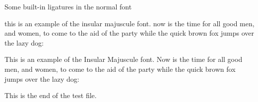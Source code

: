 \documentclass[12pt]{article}
\newcommand{\sentence}{%
this is an example of the insular majuscule font. now is the time for all good
men, and women, to come to the aid of the party while the quick brown fox
jumps over the lazy dog:}
\newcommand{\Sentence}{%
This is an example of the Insular Majuscule font. Now is the time for all good
men, and women, to come to the aid of the party while the quick brown fox
jumps over the lazy dog:}
\newcommand{\esses}{sa sb sc sd se sf sg sh si sj sk sl sm 
                    sn so sp sq sr ss st su sv sw sx sy sz}
\newcommand{\exes}{xa xb xc xd xe xf xg xh xi xj xk xl xm 
                  xn xo xp xq xr xs xt xu xv xw xx xy xz}
\newcommand{\jays}{aj bj cj dj ej fj gj hj ij jj kj lj mj 
                   nj oj pj qj rj sj tj uj vj wj xj yj zj}
\newcommand{\dees}{ad bd cd dd ed fd gd hd id jd kd ld md 
                   nd od pd qd rd sd td ud vd wd xd yd zd}
\newcommand{\ares}{ra rb rc rd re rf rg rh ri rj rk rl rm 
                   rn ro rp rq rr rs rt ru rv rw rx ry rz}
\newcommand{\Esses}{SA SB SC SD SE SF SG SH SI SJ SK SL SM 
                    SN SO SP SQ SR SS ST SU SV SW SX SY SZ}
\newcommand{\Exes}{XA XB XC XD XE XF XG XH XI XJ XK XL XM 
                  XN XO XP XQ XR XS XT XU XV XW XX XY XZ}
\newcommand{\Jays}{AJ BJ CJ DJ EJ FJ GJ HJ IJ JJ KJ LJ MJ 
                   NJ OJ PJ QJ RJ SJ TJ UJ VJ WJ XJ YJ ZJ}
\newcommand{\Dees}{AD BD CD DD ED FD GD HD ID JD KD LD MD 
                   ND OD PD QD RD SD TD UD VD WD XD YD ZD}
\newcommand{\Ares}{RA RB RC RD RE RF RG RH RI RJ RK RL RM 
                   RN RO RP RQ RR RS RT RU RV RW RX RY RZ}
\begin{document}
\begin{center}
    Some built-in ligatures in the normal font \\
\end{center}


{
\imajfamily 
\sentence{}

\Sentence{}
}
    
    This is the end of the test file.
\end{document}
